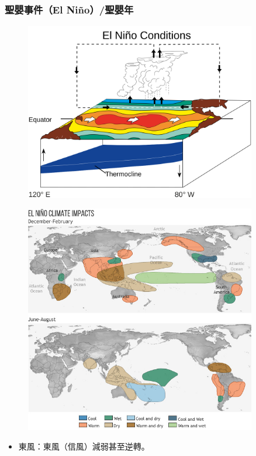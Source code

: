 \documentclass[a4paper,12pt]{report}
\begin{document}
\begin{itemize}
\subsubsection{聖嬰事件（El Niño）/聖嬰年}
\bct\begin{figure}[H]
    \centering
    \includegraphics[width=0.9\textwidth]{Nino.png}
\end{figure}\FB
\begin{figure}[H]
      \centering
      \includegraphics[width=0.9\textwidth]{NOAA_Nino.jpg}
  \end{figure}\FB\ect
\begin{itemize}
  \item 東風：東風（信風）減弱甚至逆轉。

\end{itemize}
\end{itemize}
\end{document}
